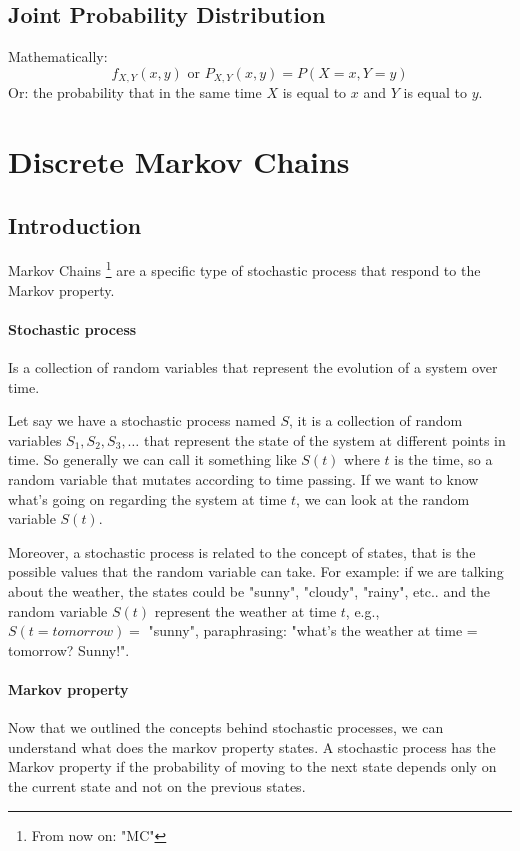 \documentclass[a4paper]{article}
\begin{document}
\subsection{Joint Probability Distribution}
Mathematically:
\[ f_{X,Y}(x,y)\text{  or  } P_{X,Y} (x,y)= P(X = x, Y = y) \]
Or: the probability that in the same time $X$ is equal to $x$ and $Y$ is equal to $y$.


\section{Discrete Markov Chains}

\subsection{Introduction}
Markov Chains \footnote{From now on: "MC"} are a specific type of stochastic process that respond to the Markov property.
\paragraph{Stochastic process} Is a collection of random variables that represent the evolution of a system over time. 

Let say we have a stochastic process named $S$, it is a collection of random variables $S_1, S_2, S_3, \ldots$ that represent the state of the system at different points in time. So generally we can call it something like $S(t)$ where $t$ is the time, so a random variable that mutates according to time passing.
If we want to know what's going on regarding the system at time $t$, we can look at the random variable $S(t)$. 

Moreover, a stochastic process is related to the concept of states, that is the possible values that the random variable can take. For example: if we are talking about the weather, the states could be "sunny", "cloudy", "rainy", etc.. and the random variable $S(t)$ represent the weather at time $t$, e.g., $S(t=tomorrow) = $ "sunny", paraphrasing: "what's the weather at time = tomorrow? Sunny!". 

\paragraph{Markov property} Now that we outlined the concepts behind stochastic processes, we can understand what does the markov property states. A stochastic process has the Markov property if the probability of moving to the next state depends only on the current state and not on the previous states.
\end{document}
